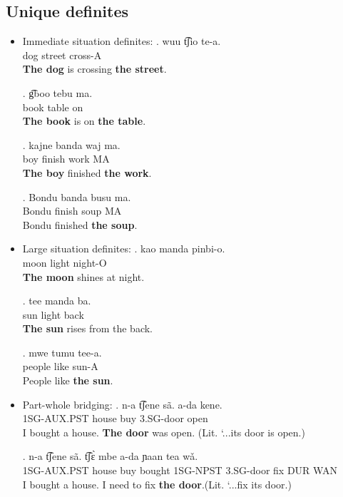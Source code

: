 \documentclass{assets/fieldnotes}
\begin{document}
\subsection{Unique definites}
\begin{itemize}
    \item Immediate situation definites:
    \exg. wuu t͡ʃio te-a.\\
    dog street cross-A\\
    \textbf{The dog} is crossing \textbf{the street}.

    \exg. g͡boo tebu ma.\\
    book table on\\   
    \textbf{The book} is on \textbf{the table}.

    \exg. kajne banda waj ma.\\
    boy finish work MA\\
    \textbf{The boy} finished \textbf{the work}.
    
    \exg. Bondu banda busu ma.\\
    Bondu finish soup MA\\
    Bondu finished \textbf{the soup}.


    \item Large situation definites:
    \exg. kao manda pinbi-o.\\
        moon light night-O\\
    \textbf{The moon} shines at night.

    \exg. tee manda ba.\\
        sun light back\\
        \textbf{The sun} rises from the back.
        
    \exg. mwe tumu tee-a.\\
        people like sun-A\\
        People like \textbf{the sun}.


    \item Part-whole bridging:
    \exg. n-a t͡ʃene sã. a-da kene.\\
        1SG-AUX.PST house buy 3.SG-door open\\
        I bought a house. \textbf{The door} was open. (Lit. `...its door is open.)

    \exg. n-a t͡ʃene sã. t͡ʃɛ̀ mbe a-da ɲaan tea wǎ.\\
        1SG-AUX.PST house buy bought 1SG-NPST 3.SG-door fix DUR WAN\\
        I bought a house. I need to fix \textbf{the door}.(Lit. `...fix its door.)


\end{itemize}
\end{document}
